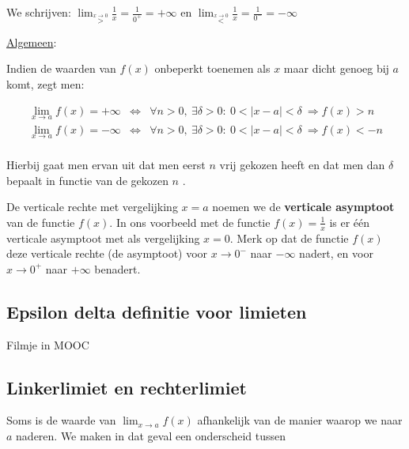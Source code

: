 \noindent We schrijven: ${\displaystyle \lim_{\overset{x\rightarrow0}{>}}}{\displaystyle \frac{1}{x}}={\displaystyle \frac{1}{0^{+}}}=+\infty$
en ${\displaystyle \lim_{\overset{x\rightarrow0}{<}}}{\displaystyle \frac{1}{x}}={\displaystyle \frac{1}{0^{-}}}=-\infty$

\medskip{}


\noindent \uline{Algemeen}:

Indien de waarden van $f(x)$ onbeperkt toenemen als $x$ maar dicht
genoeg bij $a$ komt, zegt men:

\begin{eqnarray*}
{\displaystyle \lim_{x\to a}}f(x)=+\infty & \Leftrightarrow & \forall n>0,\:\exists\delta>0:\:0<\left|x-a\right|<\delta\:\Rightarrow f(x)>n\\
{\displaystyle \lim_{x\to a}}f(x)=-\infty & \Leftrightarrow & \forall n>0,\:\exists\delta>0:\:0<\left|x-a\right|<\delta\:\Rightarrow f(x)<-n\\
\end{eqnarray*}

Hierbij gaat men ervan uit dat men eerst $n$ vrij gekozen heeft en
dat men dan $\delta$ bepaalt in functie van de gekozen $n$ .

\medskip{}

De verticale rechte met vergelijking $x=a$ noemen we de \textbf{verticale
asymptoot} van de functie $f(x)$. In ons voorbeeld met de functie
$f(x)={\displaystyle \frac{1}{x}}$ is er \'e\'en verticale asymptoot
met als vergelijking $x=0$. Merk op dat de functie $f(x)$ deze verticale
rechte (de asymptoot) voor $x\rightarrow0^{-}$ naar $-\infty$ nadert,
en voor $x\rightarrow0^{+}$ naar $+\infty$ benadert.

\subsection{Epsilon delta definitie voor limieten}
Filmje in MOOC

\subsection{Linkerlimiet en rechterlimiet}

Soms is de waarde van ${\displaystyle \lim_{x\to a}}f(x)$ afhankelijk
van de manier waarop we naar $a$ naderen. We maken in dat geval een
onderscheid tussen

\medskip{}

